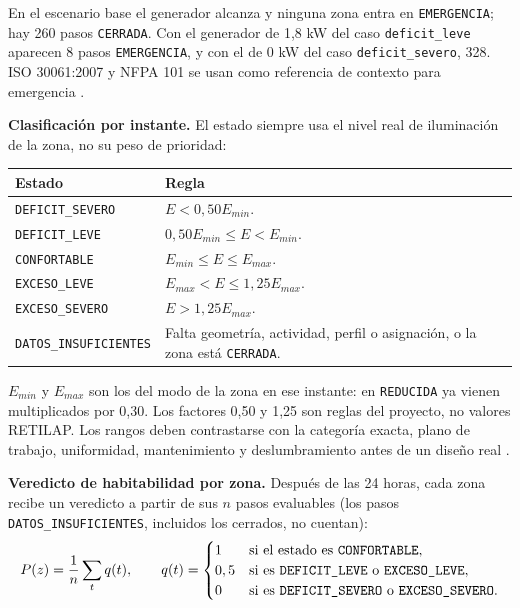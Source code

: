 \documentclass[12pt,a4paper]{article}
\newcommand{\estado}[1]{\texttt{#1}}
\newcommand{\codigo}[1]{\texttt{#1}}
\begin{document}
En el escenario base el generador alcanza y ninguna zona entra en \estado{EMERGENCIA}; hay 260 pasos \estado{CERRADA}. Con el generador de 1,8 kW del caso \codigo{deficit\_leve} aparecen 8 pasos \estado{EMERGENCIA}, y con el de 0 kW del caso \codigo{deficit\_severo}, 328. ISO 30061:2007 y NFPA 101 se usan como referencia de contexto para emergencia \cite{isoEmergency,nfpa101}.

\textbf{Clasificación por instante.} El estado siempre usa el nivel real de iluminación de la zona, no su peso de prioridad:

\begin{center}\small
\begin{tabular}{p{}p{}}
\toprule
\textbf{Estado} & \textbf{Regla}\\
\midrule
\estado{DEFICIT\_SEVERO} & $E<0,50E_{min}$.\\
\estado{DEFICIT\_LEVE} & $0,50E_{min}\leq E<E_{min}$.\\
\estado{CONFORTABLE} & $E_{min}\leq E\leq E_{max}$.\\
\estado{EXCESO\_LEVE} & $E_{max}<E\leq1,25E_{max}$.\\
\estado{EXCESO\_SEVERO} & $E>1,25E_{max}$.\\
\estado{DATOS\_INSUFICIENTES} & Falta geometría, actividad, perfil o asignación, o la zona está \estado{CERRADA}.\\
\bottomrule
\end{tabular}
\end{center}

$E_{min}$ y $E_{max}$ son los del modo de la zona en ese instante: en \estado{REDUCIDA} ya vienen multiplicados por 0,30. Los factores 0,50 y 1,25 son reglas del proyecto, no valores RETILAP. Los rangos deben contrastarse con la categoría exacta, plano de trabajo, uniformidad, mantenimiento y deslumbramiento antes de un diseño real \cite{retilap,en12464}.

\textbf{Veredicto de habitabilidad por zona.} Después de las 24 horas, cada zona recibe un veredicto a partir de sus $n$ pasos evaluables (los pasos \estado{DATOS\_INSUFICIENTES}, incluidos los cerrados, no cuentan):
\begin{equation}
 P(z)=\frac{1}{n}\sum_{t}q(t),\qquad
 q(t)=\begin{cases}
 1 & \text{si el estado es \estado{CONFORTABLE}},\\
 0,5 & \text{si es \estado{DEFICIT\_LEVE} o \estado{EXCESO\_LEVE}},\\
 0 & \text{si es \estado{DEFICIT\_SEVERO} o \estado{EXCESO\_SEVERO}}.
 \end{cases}
 \label{eq:puntaje}
\end{equation}
\end{document}
